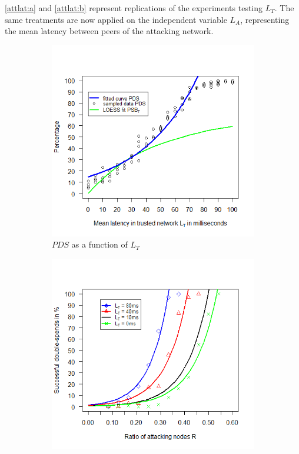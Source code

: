 \documentclass[a4paper,12pt,twoside]{report}
\begin{document}
\autoref{attlat:a} and \autoref{attlat:b} represent replications of the experiments testing $L_T$. The same treatments are now applied on the independent variable $L_A$, representing the mean latency between peers of the attacking network.
\begin{figure}[!ht]
\centering
\begin{subfigure}{.481\textwidth}
  \centering
  \includegraphics[width=\linewidth]{Experiments/TruLatency/trulat.png}
  \caption{$PDS$ as a function of $L_{T}$}
  \label{trulat:a}
\end{subfigure}%
\begin{subfigure}{.481\textwidth}
  \centering
  \includegraphics[width=\linewidth]{Experiments/TruLatency/trurat.png}

\end{subfigure}
\end{figure}
\end{document}
